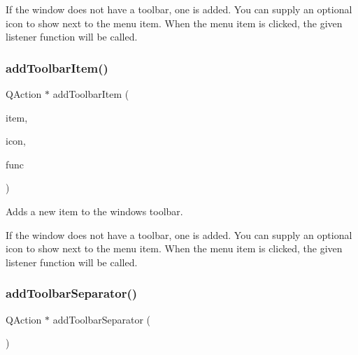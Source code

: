 If the window does not have a toolbar, one is added. You can supply an optional icon to show next to the menu item. When the menu item is clicked, the given listener function will be called. \mbox{\label{classsgl_1_1GWindow_a6daacc5873dd3a11813a68fcf88c9d6e}} 
\subsubsection{\texorpdfstring{add\+Toolbar\+Item()}{addToolbarItem()}\hspace{0.1cm}{\footnotesize\ttfamily [4/4]}}
{\footnotesize\ttfamily Q\+Action $\ast$ add\+Toolbar\+Item (\begin{DoxyParamCaption}\item[{const std\+::string \&}]{item,  }\item[{const Q\+Pixmap \&}]{icon,  }\item[{\mbox{\hyperlink{namespacesgl_a54427ce97bb1c2804e4fe2b0a62e8b17}{G\+Event\+Listener\+Void}}}]{func }\end{DoxyParamCaption})\hspace{0.3cm}{\ttfamily [virtual]}}



Adds a new item to the window\textquotesingle{}s toolbar. 

If the window does not have a toolbar, one is added. You can supply an optional icon to show next to the menu item. When the menu item is clicked, the given listener function will be called. \mbox{\label{classsgl_1_1GWindow_a885470a4fc1b578a76f6fddc2b1950a2}} 
\subsubsection{\texorpdfstring{add\+Toolbar\+Separator()}{addToolbarSeparator()}}
{\footnotesize\ttfamily Q\+Action $\ast$ add\+Toolbar\+Separator (\begin{DoxyParamCaption}{ }\end{DoxyParamCaption})\hspace{0.3cm}{\ttfamily [virtual]}}



